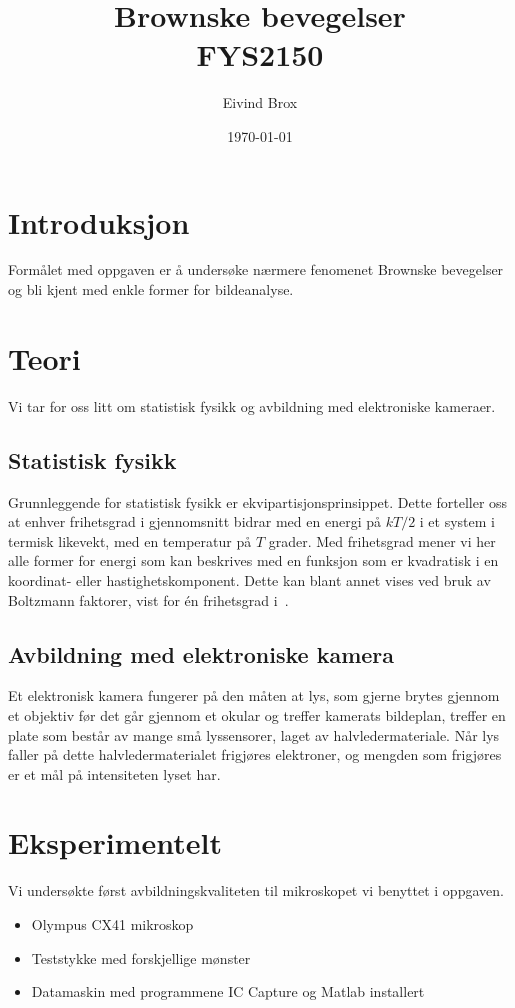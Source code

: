 \documentclass[a4paper,11pt, twocolumn]{article}
\title{Brownske bevegelser \\ FYS2150}
\author{Eivind Brox}
\date{\today}
\begin{document}
\maketitle

\begin{abstract}
\end{abstract}

\section{Introduksjon}
Formålet med oppgaven er å undersøke nærmere fenomenet Brownske bevegelser og bli kjent med enkle former for bildeanalyse.
\section{Teori}
Vi tar for oss litt om statistisk fysikk og avbildning med elektroniske kameraer. 
\subsection{Statistisk fysikk}
Grunnleggende for statistisk fysikk er ekvipartisjonsprinsippet. Dette forteller oss at enhver frihetsgrad i gjennomsnitt bidrar med en energi på $kT/2$ i et system i termisk likevekt, med en temperatur på $T$ grader. Med frihetsgrad mener vi her alle former for energi som kan beskrives med en funksjon som er kvadratisk i en koordinat- eller hastighetskomponent. Dette kan blant annet vises ved bruk av Boltzmann faktorer, vist for \'en frihetsgrad i~\cite[sek. 6.3]{Schroeder2000}. 

\subsection{Avbildning med elektroniske kamera}
Et elektronisk kamera fungerer på den måten at lys, som gjerne brytes gjennom et objektiv før det går gjennom et okular og treffer kamerats bildeplan, treffer en plate som består av mange små lyssensorer, laget av halvledermateriale. Når lys faller på dette halvledermaterialet frigjøres elektroner, og mengden som frigjøres er et mål på intensiteten lyset har. 

\section{Eksperimentelt}
Vi undersøkte først avbildningskvaliteten til mikroskopet vi benyttet i oppgaven. 
\begin{itemize}
	\item Olympus CX41 mikroskop
	\item Teststykke med forskjellige mønster
	\item Datamaskin med programmene IC Capture og Matlab installert
\end{itemize}
\end{document}
